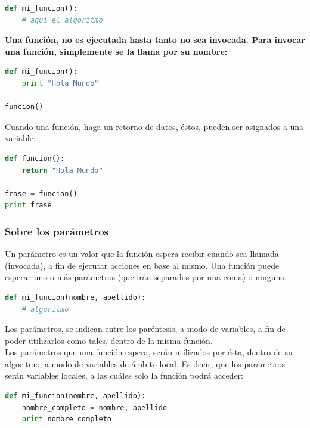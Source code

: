 \documentclass[a4paper, openright, 12pt]{article}
\begin{document}
\begin{lstlisting}[language=Python]
def mi_funcion():
    # aqui el algoritmo
\end{lstlisting}

\textbf{Una función, no es ejecutada hasta tanto no sea invocada. Para invocar una función, simplemente se la llama por su nombre:}\\

\begin{lstlisting}[language=Python]
def mi_funcion():
    print "Hola Mundo"

funcion()
\end{lstlisting}

Cuando una función, haga un retorno de datos, éstos, pueden ser asignados a una variable:\\

\begin{lstlisting}[language=Python]
def funcion():
    return "Hola Mundo"

frase = funcion()
print frase
\end{lstlisting}



    \subsubsection{Sobre los parámetros}

    Un parámetro es un valor que la función espera recibir cuando sea llamada (invocada), a fin de ejecutar acciones en base al mismo. Una función puede esperar uno o más parámetros (que irán separados por una coma) o ninguno.\\

\begin{lstlisting}[language=Python]
def mi_funcion(nombre, apellido):
    # algoritmo
\end{lstlisting}

    Los parámetros, se indican entre los paréntesis, a modo de variables, a fin de poder utilizarlos como tales, dentro de la misma función.\\

    Los parámetros que una función espera, serán utilizados por ésta, dentro de su algoritmo, a modo de variables de ámbito local. Es decir, que los parámetros serán variables locales, a las cuáles solo la función podrá acceder:


\begin{lstlisting}[language=Python]
def mi_funcion(nombre, apellido):
    nombre_completo = nombre, apellido
    print nombre_completo
\end{lstlisting}
\end{document}
